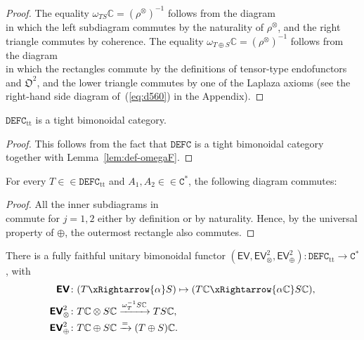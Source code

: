 \documentclass[10pt]{simplearticle}
\newcommand{\tikzinput}[1]{}
\newcommand{\DEFC}{\mathbb{\mathtt{DEFC}}}
\newcommand{\Cstar}{\mathtt{C^{*}}}
\newcommand{\mathsb}[1]{\boldsymbol{\mathsf{#1}}}
\newcommand{\EV}{\mathsb{EV}}
\newcommand{\ttt}{\operatorname{tt}}
\begin{document}
\begin{proof}
The equality $\omega_{TS}\mathbb{C}=(\rho^{\otimes})^{-1}$ follows
from the diagram
\[
\tikzinput{d382}
\]
in which the left subdiagram commutes by the naturality of $\rho^{\otimes}$,
and the right triangle commutes by coherence. The equality $\omega_{T\oplus S}\mathbb{C}=(\rho^{\otimes})^{-1}$
follows from the diagram
\[
\tikzinput{d384}
\]
in which the rectangles commute by the definitions of tensor-type
endofunctors and $\mathfrak{O}^{2}$, and the lower triangle commutes
by one of the Laplaza axioms (see the right-hand side diagram of~(\ref{eq:d560})
in the Appendix).
\end{proof}

\begin{cor}
$\DEFC_{\ttt}$ is a tight bimonoidal category.
\end{cor}

\begin{proof}
This follows from the fact that $\DEFC$ is a tight bimonoidal category
together with Lemma~\ref{lem:def-omegaF}.
\end{proof}

\begin{lem}\label{lem:aa}
For every $T\in\in\DEFC_{\ttt}$ and $A_{1},A_{2}\in\in\Cstar$,
the following diagram commutes:
\[
\tikzinput{d415}
\]
\end{lem}

\begin{proof}
All the inner subdiagrams in
\[
\tikzinput{d416}
\]
commute for $j=1,2$ either by definition or by naturality. Hence,
by the universal property of $\oplus$, the outermost rectangle also
commutes.
\end{proof}

\begin{prop}\label{prop:EV}
There
is a fully faithful unitary
bimonoidal functor $(\EV,\EV^{2}_{\otimes},\EV^{2}_{\oplus})\colon\DEFC_{\ttt}\to\Cstar$,
with
\begin{alignat*}{1}
\EV\colon & (T\xRightarrow{\alpha}S)\mapsto(T\mathbb{C}\xRightarrow{\alpha\mathbb{C}}S\mathbb{C}),\\
\EV^{2}_{\otimes}\colon & T\mathbb{C}\otimes S\mathbb{C}\xrightarrow{\omega^{-1}_{T}S\mathbb{C}}TS\mathbb{C},\\
\EV^{2}_{\oplus}\colon & T\mathbb{C}\oplus S\mathbb{C}\xrightarrow{=}(T\oplus S)\mathbb{C}.
\end{alignat*}
\end{prop}
\end{document}

